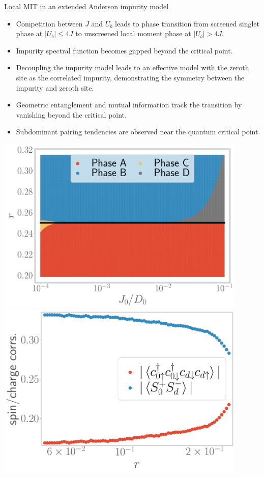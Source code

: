 \documentclass[8pt,aspectratio=169]{beamer}
\newcommand{\nitem}{\item[\ding{51}]}
\begin{document}
\begin{frame}{Local MIT in an extended Anderson impurity model}
\hspace*{-40pt}
\begin{minipage}{0.65\textwidth}
\begin{itemize}
\nitem Competition between $J$ and $U_b$ leads to phase transition from screened singlet phase at \(|U_b| \leq 4J\) to unscreened local moment phase at \(|U_b| > 4J\).
\nitem Impurity spectral function becomes gapped beyond the critical point.
\nitem Decoupling the impurity model leads to an effective model with the zeroth site as the correlated impurity, demonstrating the symmetry between the impurity and zeroth site.
\nitem Geometric entanglement and mutual information track the transition by vanishing beyond the critical point.
\nitem Subdominant pairing tendencies are observed near the quantum critical point.
\end{itemize}
\end{minipage}
\hspace*{5pt}
\begin{minipage}{0.41\textwidth}
\includegraphics[width=0.9\textwidth]{phase-map-MIT.pdf}
\includegraphics[width=0.9\textwidth]{odlro_d0.pdf}
\end{minipage}
\hspace*{-40pt}
\end{frame}
\end{document}
